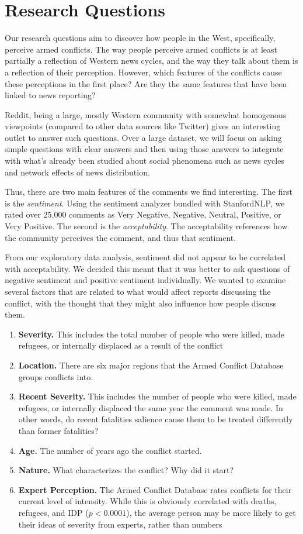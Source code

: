 \section{Research Questions}
Our research questions aim to discover how people in the West, specifically, perceive armed conflicts. The way people perceive armed conflicts is at least partially a reflection of Western news cycles, and the way they talk about them is a reflection of their perception. However, which features of the conflicts cause these perceptions in the first place? Are they the same features that have been linked to news reporting?

Reddit, being a large, mostly Western community with somewhat homogenous viewpoints (compared to other data sources like Twitter) gives an interesting outlet to answer such questions. Over a large dataset, we will focus on asking simple questions with clear answers and then using those answers to integrate with what's already been studied about social phenomena such as news cycles and network effects of news distribution. 

Thus, there are two main features of the comments we find interesting. The first is the \textit{sentiment}. Using the sentiment analyzer bundled with StanfordNLP\cite{stanfordnlp}, we rated over 25,000 comments as Very Negative, Negative, Neutral, Positive, or Very Positive. The second is the \textit{acceptability}. The acceptability references how the community perceives the comment, and thus that sentiment. 

From our exploratory data analysis, sentiment did not appear to be correlated with acceptability. We decided this meant that it was better to ask questions of negative sentiment and positive sentiment individually. We wanted to examine several factors that are related to what would affect reports discussing the conflict, with the thought that they might also influence how people discuss them.

\begin{enumerate}
\item{\textbf{Severity.} This includes the total number of people who were killed, made refugees, or internally displaced as a result of the conflict} 
\item {\textbf{Location.} There are six major regions that the Armed Conflict Database groups conflicts into.} 
\item {\textbf{Recent Severity.} This includes the number of people who were killed, made refugees, or internally displaced the same year the comment was made. In other words, do recent fatalities salience cause them to be treated differently than former fatalities?}
\item {\textbf{Age.} The number of years ago the conflict started.}
\item {\textbf{Nature.} What characterizes the conflict? Why did it start?}
\item {\textbf{Expert Perception.} The Armed Conflict Database rates conflicts for their current level of intensity. While this is obviously correlated with deaths, refugees, and IDP ($p < 0.0001$), the average person may be more likely to get their ideas of severity from experts, rather than numbers} 
\end{enumerate}

